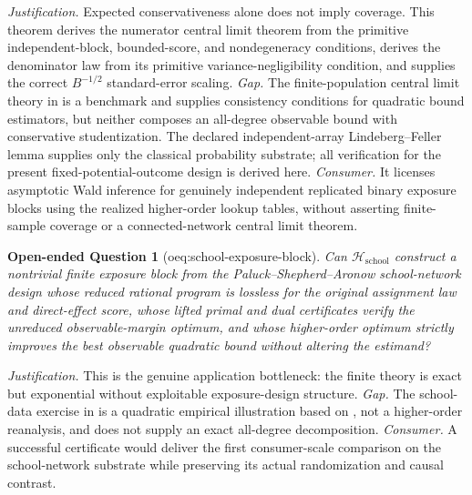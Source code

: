\documentclass{article}
\newtheorem{openendedquestion}{Open-ended Question}
\begin{document}
\par\smallskip\noindent \textit{Justification.} Expected conservativeness alone does not imply coverage. This theorem derives the numerator central limit theorem from the primitive independent-block, bounded-score, and nondegeneracy conditions, derives the denominator law from its primitive variance-negligibility condition, and supplies the correct \(B^{-1/2}\) standard-error scaling. \textit{Gap.} The finite-population central limit theory in \cite{LiDing2017FPCLT} is a benchmark and \cite{HarshawMiddletonSavje2026} supplies consistency conditions for quadratic bound estimators, but neither composes an all-degree observable bound with conservative studentization. The declared independent-array Lindeberg--Feller lemma supplies only the classical probability substrate; all verification for the present fixed-potential-outcome design is derived here. \textit{Consumer.} It licenses asymptotic Wald inference for genuinely independent replicated binary exposure blocks using the realized higher-order lookup tables, without asserting finite-sample coverage or a connected-network central limit theorem.

\begin{openendedquestion}[oeq:school-exposure-block]\label{oeq:school-exposure-block}
Can \(\mathcal H_{\mathrm{school}}\) construct a nontrivial finite exposure block from the Paluck--Shepherd--Aronow school-network design whose reduced rational program is lossless for the original assignment law and direct-effect score, whose lifted primal and dual certificates verify the unreduced observable-margin optimum, and whose higher-order optimum strictly improves the best observable quadratic bound without altering the estimand?
\end{openendedquestion}
\par\smallskip\noindent \textit{Justification.} This is the genuine application bottleneck: the finite theory is exact but exponential without exploitable exposure-design structure. \textit{Gap.} The school-data exercise in \cite{HarshawMiddletonSavje2026} is a quadratic empirical illustration based on \cite{PaluckShepherdAronow2016}, not a higher-order reanalysis, and \cite{AronowSamii2017Interference} does not supply an exact all-degree decomposition. \textit{Consumer.} A successful certificate would deliver the first consumer-scale comparison on the school-network substrate while preserving its actual randomization and causal contrast.
\end{document}
